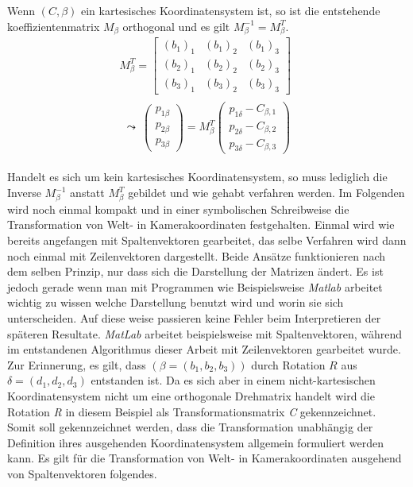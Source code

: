  Wenn $(C,\beta)$ ein kartesisches Koordinatensystem ist, so ist die entstehende  koeffizientenmatrix $M_\beta$ orthogonal und es gilt \ensuremath{M_\beta^{-1} = M_\beta^T}. 
	\begin{gather}
	M_\beta^{T} = 
	\begin{bmatrix}(b_1)_1 & (b_1)_2 & (b_1)_3\\
	(b_2)_1 & (b_2)_2 & (b_2)_3\\
	(b_3)_1 & (b_3)_2 & (b_3)_3
	\end{bmatrix} \\
	\begin{split}
	\leadsto \: \begin{pmatrix}
	p_{1\beta}\\p_{2\beta}\\ p_{3\beta}
	\end{pmatrix}
	= M_\beta^T 
	\begin{pmatrix}
	p_{1\delta} - C_{\beta,1}\\
	p_{2\delta} - C_{\beta,2}\\
	p_{3\delta} - C_{\beta,3}
	\end{pmatrix}
	\end{split} 
	\end{gather}
	
Handelt es sich um kein kartesisches Koordinatensystem, so muss lediglich die Inverse \ensuremath{M_\beta^{-1}} anstatt \ensuremath{M_\beta^T} gebildet und wie gehabt verfahren werden. Im Folgenden wird noch einmal kompakt und in einer symbolischen Schreibweise die Transformation von Welt- in Kamerakoordinaten  festgehalten. Einmal wird wie bereits angefangen mit Spaltenvektoren gearbeitet, das selbe Verfahren wird dann noch einmal mit Zeilenvektoren dargestellt. Beide Ansätze funktionieren nach dem selben Prinzip, nur dass sich die Darstellung der Matrizen ändert. Es ist jedoch gerade wenn man mit Programmen wie Beispielsweise \textit{Matlab} arbeitet wichtig zu wissen welche Darstellung benutzt wird und worin sie sich unterscheiden. Auf diese weise passieren keine Fehler beim Interpretieren der späteren Resultate. \textit{MatLab} arbeitet beispielsweise mit Spaltenvektoren, während im entstandenen Algorithmus dieser Arbeit mit Zeilenvektoren gearbeitet wurde. Zur Erinnerung, es gilt, dass $(\beta = (b_1,b_2,b_3))$ durch Rotation $R$ aus $\delta = (d_1,d_2,d_3)$ entstanden ist.
Da es sich aber in einem nicht-kartesischen Koordinatensystem nicht um eine orthogonale Drehmatrix handelt wird die Rotation \textit{R} in diesem Beispiel als Transformationsmatrix \textit{C} gekennzeichnet. Somit soll gekennzeichnet werden, dass die Transformation unabhängig der Definition ihres ausgehenden Koordinatensystem allgemein formuliert werden kann. Es gilt für die Transformation von Welt- in Kamerakoordinaten ausgehend von Spaltenvektoren folgendes.
	
